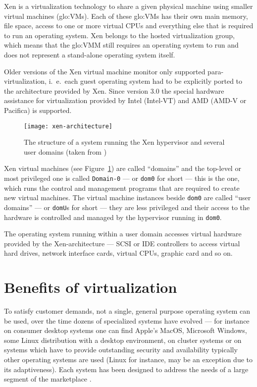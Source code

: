 \bigskip

Xen \cite{xen}  is a virtualization  technology to share a  given physical
machine  using smaller  virtual machines  (\gls{glo:VM}s).  Each  of these
\gls{glo:VM}s has their own main memory, file space, access to one or more
virtual  CPUs and everything  else that  is required  to run  an operating
system.  Xen belongs to the  hosted virtualization group, which means that
the \gls{glo:VMM} still  requires an operating system to  run and does not
represent a stand-alone operating system itself.

Older  versions  of  the   Xen  virtual  machine  monitor  only  supported
para-virtualization,   i.~e.~each  guest  operating   system  had   to  be
explicitly ported to the architecture  provided by Xen.  Since version 3.0
the  special  hardware assistance  for  virtualization  provided by  Intel
(Intel-VT) and AMD (AMD-V or Pacifica) is supported.

\begin{figure}[htbp]
  \centering
  \texttt{[image: xen-architecture]}
  \caption[Xen architecture]{The structure of a system running the Xen
    hypervisor and several user domains (taken from \cite{xen-art})}
  \label{fig:xen-architecture}
\end{figure}

Xen  virtual machines  (see Figure~\ref{fig:xen-architecture})  are called
``domains''  and   the  top-level  or   most  privileged  one   is  called
\texttt{Domain-0}  --- or  \texttt{dom0} for  short ---  this is  the one,
which runs the control and management programs that are required to create
new virtual machines.  The  virtual machine instances beside \texttt{dom0}
are called ``user  domains'' --- or \texttt{domU}s for  short --- they are
less privileged and their access to the hardware is controlled and managed
by the hypervisor running in \texttt{dom0}.

The  operating  system  running  within  a user  domain  accesses  virtual
hardware provided by  the Xen-architecture --- SCSI or  IDE controllers to
access virtual hard drives, network interface cards, virtual CPUs, graphic
card and so on.


\section{Benefits of virtualization}
\label{sec:benefits}

To  satisfy customer  demands,  not a  single,  general purpose  operating
system  can be  used, over  the time  dozens of  specialized  systems have
evolved --- for instance on  consumer desktop systems one can find Apple's
MacOS,  Microsoft   Windows,  some  Linux  distribution   with  a  desktop
environment,  on cluster  systems  or  on systems  which  have to  provide
outstanding  security and availability  typically other  operating systems
are  used   (Linux  for  instance,  may   be  an  exception   due  to  its
adaptiveness).  Each  system has been designed  to address the  needs of a
large segment of the marketplace \cite{borden89}.

